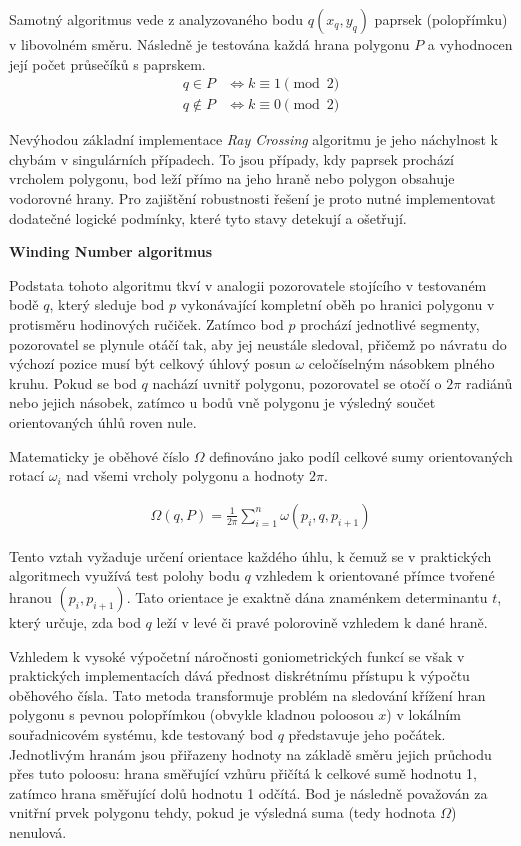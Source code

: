 \documentclass[12pt]{article}
\begin{document}
\newpage
Samotný algoritmus vede z analyzovaného bodu $q(x_q, y_q)$ paprsek (polopřímku) v libovolném směru. Následně je testována každá hrana polygonu $P$ a vyhodnocen její počet průsečíků s paprskem.
\begin{align*}
    q \in P &\iff k \equiv 1 \pmod 2 \\
    q \notin P &\iff k \equiv 0 \pmod 2
\end{align*}

Nevýhodou základní implementace \emph{Ray Crossing} algoritmu je jeho náchylnost k chybám v singulárních případech. To jsou případy, kdy paprsek prochází vrcholem polygonu, bod leží přímo na jeho hraně nebo polygon obsahuje vodorovné hrany. Pro zajištění robustnosti řešení je proto nutné implementovat dodatečné logické podmínky, které tyto stavy detekují a ošetřují.

\textbf{Winding Number algoritmus}

 Podstata tohoto algoritmu tkví v analogii pozorovatele stojícího v testovaném bodě $q$, který sleduje bod $p$ vykonávající kompletní oběh po hranici polygonu v protisměru hodinových ručiček. Zatímco bod $p$ prochází jednotlivé segmenty, pozorovatel se plynule otáčí tak, aby jej neustále sledoval, přičemž po návratu do výchozí pozice musí být celkový úhlový posun $\omega$ celočíselným násobkem plného kruhu. Pokud se bod $q$ nachází uvnitř polygonu, pozorovatel se otočí o $2\pi$ radiánů nebo jejich násobek, zatímco u bodů vně polygonu je výsledný součet orientovaných úhlů roven nule.

Matematicky je oběhové číslo $\Omega$ definováno jako podíl celkové sumy orientovaných rotací $\omega_i$ nad všemi vrcholy polygonu a hodnoty $2\pi$. 

\begin{align*}
    \Omega(q, P) = \frac{1}{2\pi} \sum_{i=1}^{n} \omega(p_i, q, p_{i+1})
\end{align*}

Tento vztah vyžaduje určení orientace každého úhlu, k čemuž se v praktických algoritmech využívá test polohy bodu $q$ vzhledem k orientované přímce tvořené hranou $(p_i, p_{i+1})$. Tato orientace je exaktně dána znaménkem determinantu $t$, který určuje, zda bod $q$ leží v levé či pravé polorovině vzhledem k dané hraně.

Vzhledem k vysoké výpočetní náročnosti goniometrických funkcí se však v praktických implementacích dává přednost diskrétnímu přístupu k výpočtu oběhového čísla. Tato metoda transformuje problém na sledování křížení hran polygonu s pevnou polopřímkou (obvykle kladnou poloosou $x$) v lokálním souřadnicovém systému, kde testovaný bod $q$ představuje jeho počátek. Jednotlivým hranám jsou přiřazeny hodnoty na základě směru jejich průchodu přes tuto poloosu: hrana směřující vzhůru přičítá k celkové sumě hodnotu 1, zatímco hrana směřující dolů hodnotu 1 odčítá. Bod je následně považován za vnitřní prvek polygonu tehdy, pokud je výsledná suma (tedy hodnota $\Omega$) nenulová.
\end{document}
